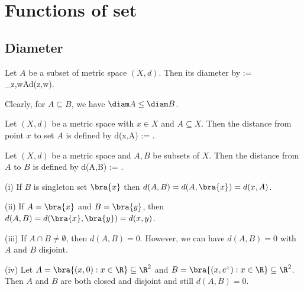 



\section{Functions of set}

\subsection{Diameter}

\begin{definition}[diameter]
Let $A$ be a subset of metric space $(X,d)$. Then its diameter by
\be
\diam{} := \sup_{z,w\in A}d(z,w).
\ee
\end{definition}


\begin{remark}
Clearly, for $A\subseteq B$, we have $\diam A \leq \diam B$.
\end{remark}


\begin{definition}
Let $(X,d)$ be a metric space with $x\in X$ and $A\subseteq X$. Then the distance from point $x$ to set $A$ is defined by
\be
d(x,A) := \inf{}.
\ee
\end{definition}


\begin{definition}
Let $(X,d)$ be a metric space and $A,B$ be subsets of $X$. Then the distance from $A$ to $B$ is defined by
\be
d(A,B) := \inf{}.
\ee
\end{definition}

\begin{example}
\ben
\item [(i)] If $B$ is singleton set $\bra{x}$ then $d(A,B) = d(A,\bra{x}) = d(x,A)$.
\item [(ii)] If $A = \bra{x}$ and $B= \bra{y}$, then $d(A,B) = d(\bra{x},\bra{y}) = d(x,y)$.
\item [(iii)] If $A\cap B \neq \emptyset$, then $d(A,B) = 0$. However, we can have $d(A,B) = 0$ with $A$ and $B$ disjoint.
\item [(iv)] Let $A = \bra{(x,0):x\in \R}\subseteq \R^2$ and $B = \bra{(x,e^x):x\in \R} \subseteq \R^2$. Then $A$ and $B$ are both closed and disjoint and still $d(A,B) = 0$.
\een
\end{example}

